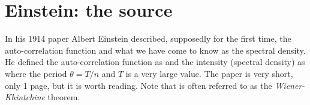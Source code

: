 \section{Einstein: the source}
In his 1914 paper \cite{einstein14} Albert Einstein described,
supposedly for the first time, the auto-correlation function and
what we have come to know as the spectral density. He defined the
auto-correlation function as
and the intensity (spectral density) as
where the period $\theta = T/n$ and $T$ is a very large value. The
paper is very short, only 1 page, but it is worth reading. Note that
 is often referred to as the {\em Wiener-Khintchine}  theorem.








